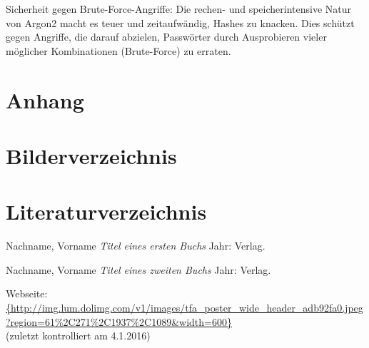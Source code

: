 \documentclass[12pt,a4paper]{article} %
\begin{document}
Sicherheit gegen Brute-Force-Angriffe: Die rechen- und speicherintensive Natur von Argon2 macht es teuer und zeitaufwändig, Hashes zu knacken. Dies schützt gegen Angriffe, die darauf abzielen, Passwörter durch Ausprobieren vieler möglicher Kombinationen (Brute-Force) zu erraten.

\newpage
   
  
\appendix
\section{Anhang}
\newpage





\section{Bilderverzeichnis}
\listoffigures



\newpage
\section{Literaturverzeichnis}

\begin{thebibliography}{1} %


 Nachname, Vorname {\em Titel eines ersten Buchs} Jahr: Verlag.

 Nachname, Vorname {\em Titel eines zweiten Buchs} Jahr: Verlag.

 Webseite: \url{{http://img.lum.dolimg.com/v1/images/tfa_poster_wide_header_adb92fa0.jpeg?region=61%
\\(zuletzt kontrolliert am 4.1.2016)


\end{thebibliography}
\end{document}
